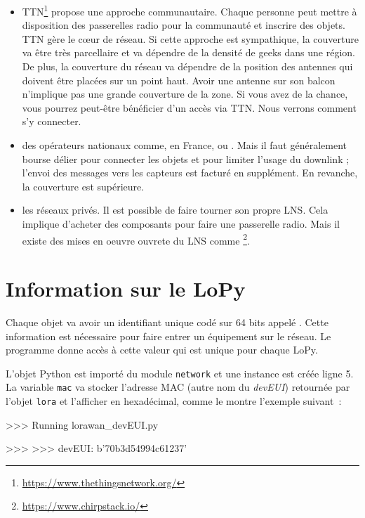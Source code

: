 \begin{itemize}
    \item  \ac{TTN}\footnote{\url{https://www.thethingsnetwork.org/}} propose une approche communautaire. Chaque personne peut mettre à disposition des passerelles radio pour la communauté et inscrire des objets. TTN gère le cœur de réseau. Si cette approche est sympathique, la couverture va être très parcellaire et va dépendre de la densité de geeks dans une région. De plus, la couverture du réseau va dépendre de la position des antennes qui doivent être placées sur un point haut. Avoir une antenne sur son balcon n’implique pas une grande couverture de la zone. Si vous avez de la chance, vous pourrez peut-être bénéficier d’un accès via TTN. Nous verrons comment s’y connecter.
    \item des opérateurs nationaux comme, en France,  ou . Mais il faut généralement bourse délier pour connecter les objets et pour limiter l’usage du downlink ; l’envoi des messages vers les capteurs est facturé en supplément. En revanche, la couverture est supérieure.
    \item les réseaux privés. Il est possible de faire tourner son propre LNS. Cela implique d’acheter des composants pour faire une passerelle radio. Mais il existe des mises en oeuvre ouvrete du LNS comme \footnote{\url{https://www.chirpstack.io/}}. 

\end{itemize}

\section{Information sur le LoPy}

Chaque objet va avoir un identifiant unique codé sur 64 bits appelé \textit{}. Cette information est nécessaire pour faire entrer un équipement sur le réseau. Le programme  donne accès à cette valeur qui est unique pour chaque LoPy.

\label{prog-devEUI}

L’objet Python  est importé du module \texttt{network} et une instance est créée ligne 5. La variable \texttt{mac} va stocker l’adresse MAC (autre nom du \textit{devEUI}) retournée par l’objet \texttt{lora} et l'afficher en hexadécimal, comme le montre l’exemple suivant~:

\begin{termc}[backgroundcolor=\color{gray!10}, basicstyle=\ttfamily\small, escapechar=@] 
>>> Running lorawan_devEUI.py

>>>
>>>
devEUI:  b'70b3d54994c61237'
\end{termc}

